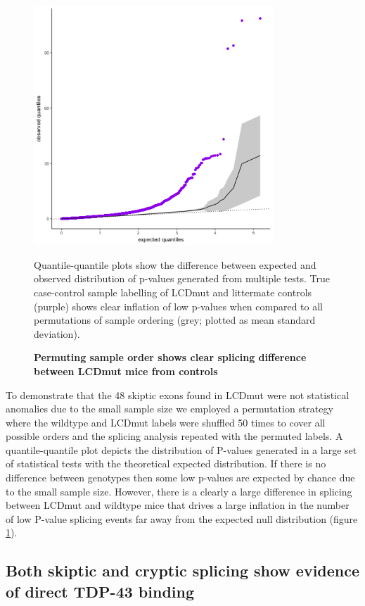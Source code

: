 \begin{figure}[h!]
	\begin{center}
		\includegraphics[width=9cm]{Figures/05_tdp_mice/permutation_ribbon.png}
	\end{center}
	\caption{\textbf{Permuting sample order shows clear splicing difference between LCDmut mice from controls}}
	Quantile-quantile plots show the difference between expected and observed distribution of p-values generated from multiple tests. True case-control sample labelling of LCDmut and littermate controls (purple) shows clear inflation of low p-values when compared to all permutations of sample ordering (grey; plotted as mean \pm standard deviation).
	\label{fig:permutation}
\end{figure}

To demonstrate that the 48 skiptic exons found in LCDmut were not statistical anomalies due to the small sample size we employed a permutation strategy where the wildtype and LCDmut labels were shuffled 50 times to cover all possible orders and the splicing analysis repeated with the permuted labels. A quantile-quantile plot depicts the distribution of P-values generated in a large set of statistical tests with the theoretical expected distribution. If there is no difference between genotypes then some low p-values are expected by chance due to the small sample size. However, there is a clearly a large difference in splicing between LCDmut and wildtype mice that drives a large inflation in the number of low P-value splicing events far away from the expected null distribution (figure \ref{fig:permutation}).   


\subsection{Both skiptic and cryptic splicing show evidence of direct TDP-43 binding}

